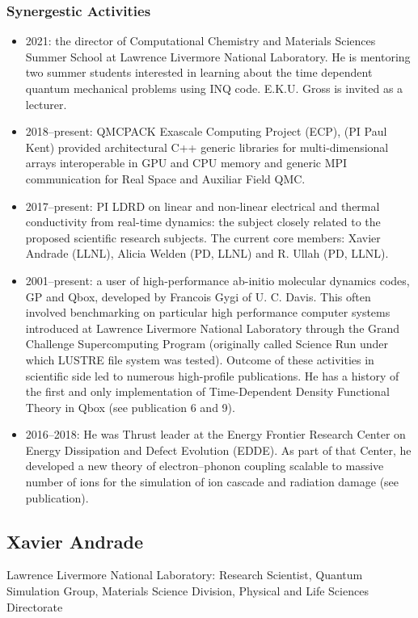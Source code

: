 \subsubsection*{Synergestic Activities}
\begin{itemize}
    \item 2021: the director of Computational Chemistry and Materials Sciences Summer School at Lawrence Livermore National Laboratory. He is mentoring two summer students interested in learning about the time dependent quantum mechanical problems using INQ code. E.K.U. Gross is invited as a lecturer.
    \item 2018–present: QMCPACK Exascale Computing Project (ECP), (PI Paul Kent) provided architectural C++ generic libraries for multi-dimensional arrays interoperable in GPU and CPU memory and generic MPI communication for Real Space and Auxiliar Field QMC.
    \item 2017–present: PI LDRD on linear and non-linear electrical and thermal conductivity from real-time dynamics: the subject closely related to the proposed scientific research subjects. The current core members: Xavier Andrade (LLNL), Alicia Welden (PD, LLNL) and R. Ullah (PD, LLNL).
    \item 2001–present: a user of high-performance ab-initio molecular dynamics codes, GP and Qbox, developed by Francois Gygi of U. C. Davis. This often involved benchmarking on particular high performance computer systems introduced at Lawrence Livermore National Laboratory through the Grand Challenge Supercomputing Program (originally called Science Run under which LUSTRE file system was tested). Outcome of these activities in scientific side led to numerous high-profile publications. He has a history of the first and only implementation of Time-Dependent Density Functional Theory in Qbox (see publication 6 and 9).
    \item 2016–2018: He was Thrust leader at the Energy Frontier Research Center on Energy Dissipation and Defect Evolution (EDDE). As part of that Center, he developed a new theory of electron–phonon coupling scalable to massive number of ions for the simulation of ion cascade and radiation damage (see publication).
\end{itemize}
\clearpage

\subsection*{Xavier Andrade}
Lawrence Livermore National Laboratory: Research Scientist, Quantum Simulation Group, Materials Science Division, Physical and Life Sciences Directorate


